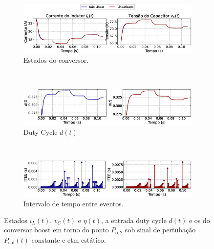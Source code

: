 \begin{figure}[H]
  \centering
  \captionsetup{justification=centering}
  \begin{subfigure}{1.\textwidth}
    \centering
    \includegraphics[width=1.\textwidth]{figuras/dynamic-etm/boost/sim2/op2/result.eps}
    \caption{Estados do conversor.}
    \label{fig:boost_converter_constant_pcpl_dynamic_etm_op2_a}
  \end{subfigure}
  \\[6pt]
  \begin{subfigure}{1.\textwidth}
    \centering
    \includegraphics[width=1.\textwidth]{figuras/dynamic-etm/boost/sim2/op2/duty-cycle.eps}
    \caption{Duty Cycle $d(t)$}
    \label{fig:boost_converter_constant_pcpl_dynamic_etm_op2_b}
  \end{subfigure}
  \\[6pt]
  \begin{subfigure}{1.\textwidth}
    \centering
    \includegraphics[width=1.\textwidth]{figuras/dynamic-etm/boost/sim2/op2/inter-event-times.eps}
    \caption{Intervalo de tempo entre eventos.}
    \label{fig:boost_converter_constant_pcpl_dynamic_etm_op2_c}
  \end{subfigure}
  \caption{Estados $i_L(t)$, $v_C(t)$ e $\eta(t)$, a entrada duty cycle $d(t)$ e os  do conversor boost em torno do ponto $P_{\mathrm{o}, 2}$ sob sinal de pertubação $P_{\mathrm{cpl}}(t)$ constante e \acrshort{etm} estático.}
  \label{fig:boost_converter_constant_pcpl_dynamic_etm_op2}
\end{figure}


